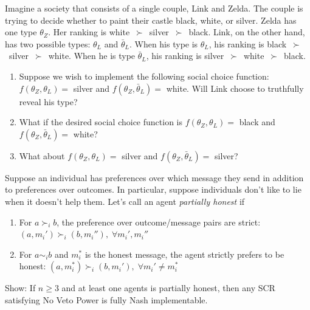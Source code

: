 \documentclass[10pt]{article}
\begin{document}
\begin{spacing}{1.0}
\begin{exercise}
  Imagine a society that consists of a single couple, Link and Zelda. The
  couple is trying to decide whether to paint their castle black, white, or
  silver. Zelda has one type $\theta_Z$. Her ranking is
  white~$\succ$~silver~$\succ$~black. Link, on the other hand, has two
  possible types: $\theta_L$ and $\bar{\theta}_L$. When his type is
  $\theta_L$, his ranking is black~$\succ$~silver~$\succ$~white. When he is
  type $\bar{\theta}_L$, his ranking is
  silver~$\succ$~white~$\succ$~black.
  \begin{enumerate}
  \item Suppose we wish to implement the following social choice function:
    $f(\theta_Z, \theta_L) =$ silver and $f(\theta_Z, \bar{\theta}_L) =$
    white. Will Link choose to truthfully reveal his type?
  \item What if the desired social choice function is
    $f(\theta_Z, \theta_L) =$ black and $f(\theta_Z,
    \bar{\theta}_L) =$ white?
  \item What about  $f(\theta_Z, \theta_L) =$ silver and $f(\theta_Z,
  \bar{\theta}_L) =$ silver?
  \end{enumerate}
\end{exercise}

\begin{exercise}
  Suppose an individual has preferences over which message they send in addition to
  preferences over outcomes. In particular, suppose individuals don't like to lie
  when it doesn't help them. Let's call an agent \emph{partially honest} if
  \begin{enumerate}
  \item For $a \succ_i b$, the preference over outcome/message pairs are strict: $(a, m_i') \succ_i (b, m_i''),\;\forall m_i', m_i''$
  \item For $a \sim_i b$ and $m_i^*$ is the honest message, the agent strictly
    prefers to be honest: $(a, m_i^*) \succ_i (b, m_i'), \; \forall m_i' \ne m_i^*$
  \end{enumerate}
  Show: If $n \ge 3$ and at least one agents is partially honest, then any SCR
  satisfying No Veto Power is fully Nash implementable.
\end{exercise}


\end{spacing}
\end{document}
